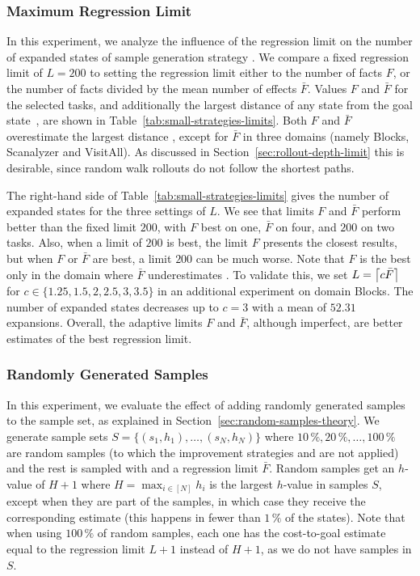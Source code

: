 

\subsubsection{Maximum Regression Limit}

In this experiment, we analyze the influence of the regression limit on the number of expanded states of sample generation strategy \bfsrw. We compare a fixed regression limit of $L=200$ to setting the regression limit either to the number of facts $F$, or the number of facts divided by the mean number of effects $\bar F$. Values $F$ and $\bar F$ for the selected tasks, and additionally the largest distance of any state from the goal state~\distfarthest, are shown in Table~\ref{tab:small-strategies-limits}. Both $F$ and $\bar F$ overestimate the largest distance \distfarthest, except for $\bar F$ in three domains (namely Blocks, Scanalyzer and VisitAll). As discussed in Section~\ref{sec:rollout-depth-limit} this is desirable, since random walk rollouts do not follow the shortest paths.



The right-hand side of Table~\ref{tab:small-strategies-limits} gives the number of expanded states for the three settings of $L$. We see that limits $F$ and $\bar F$ perform better than the fixed limit $200$, with $F$ best on one, $\bar F$ on four, and $200$ on two tasks. Also, when a limit of $200$ is best, the limit $F$ presents the closest results, but when $F$ or $\bar F$ are best, a limit $200$ can be much worse.  Note that $F$ is the best only in the domain where $\bar F$ underestimates \distfarthest.  To validate this, we set $L=\left\lceil c\bar F\right\rceil$ for $c\in\{1.25,1.5,2,2.5,3,3.5\}$ in an additional experiment on domain Blocks. The number of expanded states decreases up to $c=3$ with a mean of $52.31$ expansions. Overall, the adaptive limits $F$ and $\bar F$, although imperfect, are better estimates of the best regression limit.

\subsubsection{Randomly Generated Samples}

In this experiment, we evaluate the effect of adding randomly generated samples to the sample set, as explained in Section~\ref{sec:random-samples-theory}. We generate sample sets $S=\{(s_1,h_1),\ldots,(s_N,h_N)\}$ where $10\,\%, 20\,\%,\ldots,100\,\%$ are random samples (to which the improvement strategies \hmin and \hvfc are not applied) and the rest is sampled with \bfsrw and a regression limit $\bar F$. Random samples get an $h$-value of $H+1$ where $H=\max_{i\in[N]} h_i$ is the largest $h$-value in samples $S$, except when they are part of the samples, in which case they receive the corresponding estimate (this happens in fewer than $1\,\%$ of the states). Note that when using $100\,\%$ of random samples, each one has the cost-to-goal estimate equal to the regression limit $L+1$ instead of $H+1$, as we do not have samples in $S$.

